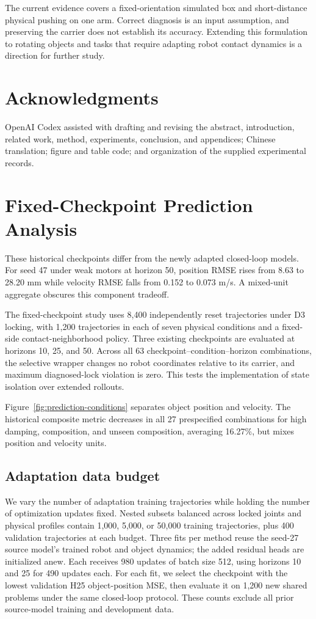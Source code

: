 \documentclass[conference]{IEEEtran}
\begin{document}
The current evidence covers a fixed-orientation simulated box and short-distance physical pushing on one arm. Correct diagnosis is an input assumption, and preserving the carrier does not establish its accuracy. Extending this formulation to rotating objects and tasks that require adapting robot contact dynamics is a direction for further study.

\section*{Acknowledgments}
OpenAI Codex assisted with drafting and revising the abstract, introduction, related work, method, experiments, conclusion, and appendices; Chinese translation; figure and table code; and organization of the supplied experimental records.



\appendices
\section{Fixed-Checkpoint Prediction Analysis}
These historical checkpoints differ from the newly adapted closed-loop models. For seed 47 under weak motors at horizon 50, position RMSE rises from 8.63 to 28.20 mm while velocity RMSE falls from 0.152 to 0.073 m/s. A mixed-unit aggregate obscures this component tradeoff.

The fixed-checkpoint study uses 8,400 independently reset trajectories under D3 locking, with 1,200 trajectories in each of seven physical conditions and a fixed-side contact-neighborhood policy. Three existing checkpoints are evaluated at horizons 10, 25, and 50. Across all 63 checkpoint--condition--horizon combinations, the selective wrapper changes no robot coordinates relative to its carrier, and maximum diagnosed-lock violation is zero. This tests the implementation of state isolation over extended rollouts.

Figure~\ref{fig:prediction-conditions} separates object position and velocity. The historical composite metric decreases in all 27 prespecified combinations for high damping, composition, and unseen composition, averaging 16.27\%, but mixes position and velocity units. 

\subsection{Adaptation data budget}

We vary the number of adaptation training trajectories while holding the number of optimization updates fixed. Nested subsets balanced across locked joints and physical profiles contain 1,000, 5,000, or 50,000 training trajectories, plus 400 validation trajectories at each budget. Three fits per method reuse the seed-27 source model's trained robot and object dynamics; the added residual heads are initialized anew. Each receives 980 updates of batch size 512, using horizons 10 and 25 for 490 updates each. For each fit, we select the checkpoint with the lowest validation H25 object-position MSE, then evaluate it on 1,200 new shared problems under the same closed-loop protocol. These counts exclude all prior source-model training and development data.
\end{document}
